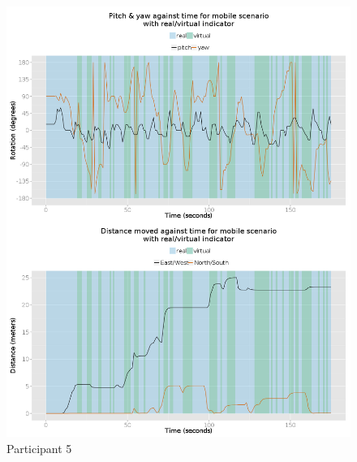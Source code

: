 \begin{figure}[h]
	\begin{center}
		\includegraphics[width=\linewidth]{images/29082014_1350_2up.png}
		\caption{Participant 5}
		\label{participant_5_2up}
	\end{center}
\end{figure}

